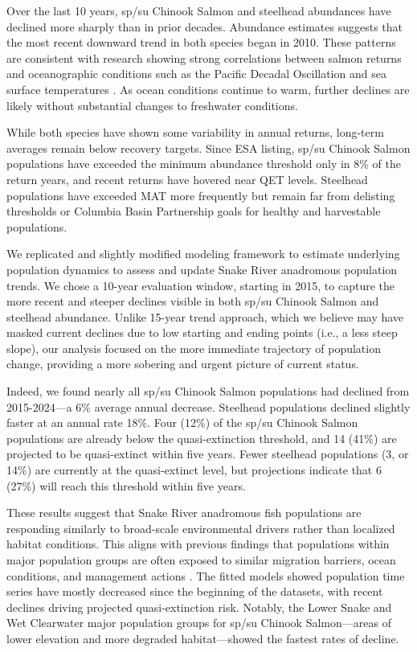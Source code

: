 \documentclass[12pt,a4paper]{article}
\begin{document}
Over the last 10 years, sp/su Chinook Salmon and steelhead abundances have declined more sharply than in prior decades. Abundance estimates suggests that the most recent downward trend in both species began in 2010. These patterns are consistent with research showing strong correlations between salmon returns and oceanographic conditions such as the Pacific Decadal Oscillation and sea surface temperatures \autocite{mantua_pacific_1997,crozier_climate_2021}. As ocean conditions continue to warm, further declines are likely without substantial changes to freshwater conditions.

While both species have shown some variability in annual returns, long-term averages remain below recovery targets. Since ESA listing, sp/su Chinook Salmon populations have exceeded the minimum abundance threshold only in 8\% of the return years, and recent returns have hovered near QET levels. Steelhead populations have exceeded MAT more frequently but remain far from delisting thresholds or Columbia Basin Partnership goals for healthy and harvestable populations.

We replicated and slightly modified \textcite{ford_biological_2022} modeling framework to estimate underlying population dynamics to assess and update Snake River anadromous population trends. We chose a 10-year evaluation window, starting in 2015, to capture the more recent and steeper declines visible in both sp/su Chinook Salmon and steelhead abundance. Unlike \textcite{ford_biological_2022} 15-year trend approach, which we believe may have masked current declines due to low starting and ending points (i.e., a less steep slope), our analysis focused on the more immediate trajectory of population change, providing a more sobering and urgent picture of current status.

Indeed, we found nearly all sp/su Chinook Salmon populations had declined from 2015-2024---a 6\% average annual decrease. Steelhead populations declined slightly faster at an annual rate 18\%. Four (12\%) of the sp/su Chinook Salmon populations are already below the quasi-extinction threshold, and 14 (41\%) are projected to be quasi-extinct within five years. Fewer steelhead populations (3, or 14\%) are currently at the quasi-extinct level, but projections indicate that 6 (27\%) will reach this threshold within five years.

These results suggest that Snake River anadromous fish populations are responding similarly to broad-scale environmental drivers rather than localized habitat conditions. This aligns with previous findings that populations within major population groups are often exposed to similar migration barriers, ocean conditions, and management actions \autocite{copeland_how_2024}. The fitted models showed population time series have mostly decreased since the beginning of the datasets, with recent declines driving projected quasi-extinction risk. Notably, the Lower Snake and Wet Clearwater major population groups for sp/su Chinook Salmon---areas of lower elevation and more degraded habitat---showed the fastest rates of decline.
\end{document}
